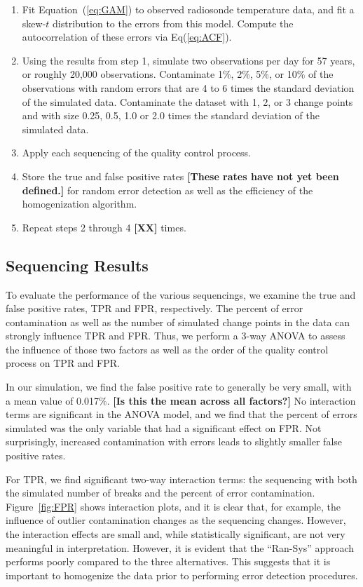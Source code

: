 \documentclass[12pt]{article}
\begin{document}
\begin{doublespacing}
\begin{enumerate}
	\item Fit Equation~(\ref{eq:GAM}) to observed radiosonde temperature data, and fit a skew-$t$ distribution to the errors from this model.  Compute the autocorrelation of these errors via Eq(\ref{eq:ACF}).
	\item Using the results from step 1, simulate two observations per day for 57 years, or roughly 20,000 observations.  Contaminate 1\%, 2\%, 5\%, or 10\% of the observations with random errors that are 4 to 6 times the standard deviation of the simulated data.  Contaminate the dataset with 1, 2, or 3 change points and with size 0.25, 0.5, 1.0 or 2.0 times the standard deviation of the simulated data.
	\item Apply each sequencing of the quality control process.
	\item Store the true and false positive rates \textbf{[These rates have not yet been defined.]} for random error detection as well as the efficiency of the homogenization algorithm.
	\item Repeat steps 2 through 4 \textbf{[XX]} times.
	\end{enumerate}



\subsection{Sequencing Results}

To evaluate the performance of the various sequencings, we examine the true and false positive rates, TPR and FPR, respectively.  The percent of error contamination as well as the number of simulated change points in the data can strongly influence TPR and FPR.  Thus, we perform a 3-way ANOVA to assess the influence of those two factors as well as the order of the quality control process on TPR and FPR.

In our simulation, we find the false positive rate to generally be very small, with a mean value of 0.017\%. \textbf{[Is this the mean across all factors?]}  No interaction terms are significant in the ANOVA model, and we find that the percent of errors simulated was the only variable that had a significant effect on FPR.  Not surprisingly, increased contamination with errors leads to slightly smaller false positive rates.

For TPR, we find significant two-way interaction terms: the sequencing with both the simulated number of breaks and the percent of error contamination.  Figure~\ref{fig:FPR} shows interaction plots, and it is clear that, for example, the influence of outlier contamination changes as the sequencing changes.  However, the interaction effects are small and, while statistically significant, are not very meaningful in interpretation.  However, it is evident that the ``Ran-Sys'' approach performs poorly compared to the three alternatives.  This suggests that it is important to homogenize the data prior to performing error detection procedures.




\end{doublespacing}
\end{document}
